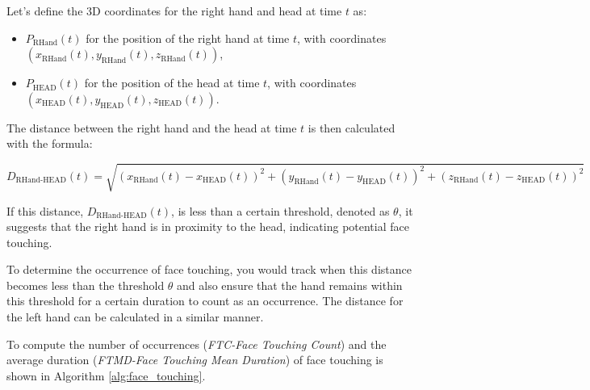 Let's define the 3D coordinates for the right hand and head at time $t$ as:
\begin{itemize}
\item $P_{\text{RHand}}(t)$ for the position of the right hand at time $t$, with coordinates $(x_{\text{RHand}}(t), y_{\text{RHand}}(t), z_{\text{RHand}}(t))$,
\item $P_{\text{HEAD}}(t)$ for the position of the head at time $t$, with coordinates $(x_{\text{HEAD}}(t), y_{\text{HEAD}}(t), z_{\text{HEAD}}(t))$.
\end{itemize}

The distance between the right hand and the head at time $t$ is then calculated with the formula:

\begin{equation}
D_{\text{RHand-HEAD}}(t) = \sqrt{(x_{\text{RHand}}(t) - x_{\text{HEAD}}(t))^2 + (y_{\text{RHand}}(t) - y_{\text{HEAD}}(t))^2 + (z_{\text{RHand}}(t) - z_{\text{HEAD}}(t))^2}
\end{equation}

If this distance, $D_{\text{RHand-HEAD}}(t)$, is less than a certain threshold, denoted as $\theta$, it suggests that the right hand is in proximity to the head, indicating potential face touching.

To determine the occurrence of face touching, you would track when this distance becomes less than the threshold $\theta$ and also ensure that the hand remains within this threshold for a certain duration to count as an occurrence. The distance for the left hand can be calculated in a similar manner.

To compute the number of occurrences (\textit{FTC-Face Touching Count}) and the average duration (\textit{FTMD-Face Touching Mean Duration}) of face touching is shown in Algorithm \ref{alg:face_touching}.

